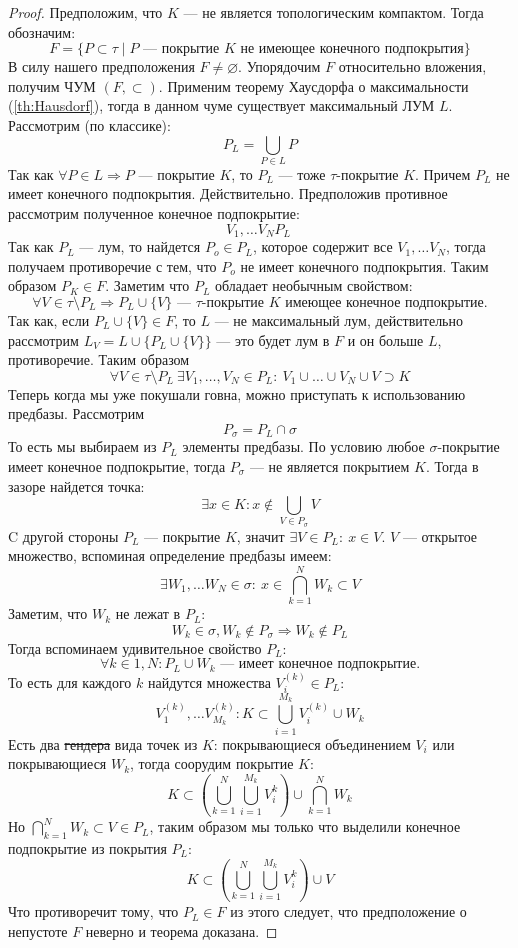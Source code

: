 \begin{proof}
	Предположим, что $K$ --- не является топологическим компактом. Тогда обозначим:
	$$
	F = \{P \subset \tau \mid P \text{ --- покрытие $K$ не имеющее конечного подпокрытия}\}
	$$
	В силу нашего предположения $F \neq \varnothing$. Упорядочим $F$ относительно вложения, получим ЧУМ $(F, \subset)$. Применим теорему Хаусдорфа о максимальности (\ref{th:Hausdorf}), тогда в данном чуме существует максимальный ЛУМ $L$. Рассмотрим (по классике):
	$$
	P_L = \bigcup_{P \in L }P
	$$
	Так как $\forall P \in L \Rightarrow P$ --- покрытие $K$, то $P_L$ --- тоже $\tau$-покрытие $K$. Причем $P_L$ не имеет конечного подпокрытия. Действительно. Предположив противное рассмотрим полученное конечное подпокрытие:
	$$
	V_1, \dots V_N P_L\
	$$
	Так как $P_L$ --- лум, то найдется $P_o \in P_L$, которое содержит все $V_1, \dots V_N$, тогда получаем противоречие с тем, что $P_o$ не имеет конечного подпокрытия. Таким образом $P_K \in F$. Заметим что $P_L$ обладает необычным свойством:
	$$
	\forall V \in \tau \setminus P_L \Rightarrow P_L \cup \{V\} \text{ --- $\tau$-покрытие $K$ имеющее конечное подпокрытие.}
	$$
	Так как, если $P_L \cup \{V\} \in F$, то $L$ --- не максимальный лум, действительно рассмотрим $L_V = L \cup \{P_L \cup \{V\}\}$ --- это будет лум в $F$ и он больше $L$, противоречие. 
	Таким образом 
	$$
	\forall V \in \tau \setminus P_L \ \exists V_1, \dots, V_N \in P_L: \ V_1 \cup \dots \cup V_N \cup V \supset K
	$$
	Теперь когда мы уже покушали говна, можно приступать к использованию предбазы. Рассмотрим 
	$$
	P_\sigma = P_L \cap \sigma
	$$
	То есть мы выбираем из $P_L$ элементы предбазы. По условию любое $\sigma$-покрытие имеет конечное подпокрытие, тогда $P_\sigma$ --- не является покрытием $K$. Тогда в зазоре найдется точка:
	$$
	\exists x \in K: x \notin \bigcup_{V \in P_\sigma} V
	$$
	C другой стороны $P_L$ --- покрытие $K$, значит $\exists V \in P_L: \ x \in V$. $V$ --- открытое множество, вспоминая определение предбазы имеем:
	$$
	\exists W_1, \dots W_N \in \sigma:  \  x \in \bigcap_{k=1}^N W_k \subset V
	$$
	Заметим, что $W_k$ не лежат в $P_L$: 
	$$
	W_k \in \sigma, W_k \notin P_\sigma \Rightarrow W_k \notin P_L
	$$
	Тогда вспоминаем удивительное свойство $P_L$: 
	$$
	\forall k \in 1,N : P_L\cup W_k \text{ --- имеет конечное подпокрытие.}
	$$
	То есть для каждого $k$ найдутся множества $V_i^{(k)} \in P_L$:
	$$
	V_1^{(k)}, \dots V_{M_k}^{(k)}: K \subset \bigcup_{i=1}^{M_k}V_i^{(k)} \cup W_k 
	$$
	Есть два \sout{гендера} вида точек из $K$: покрывающиеся объединением $V_{i}$ или покрывающиеся $W_k$, тогда соорудим покрытие $K$:
	$$
	K \subset \left(\bigcup_{k = 1}^N \bigcup_{i =1}^{M_k} V_i^{k}\right) \cup \bigcap_{k = 1}^N W_k
	$$
	Но $\bigcap_{k = 1}^N W_k \subset V \in P_L$, таким образом мы только что выделили конечное подпокрытие из покрытия $P_L$:
	$$
	K \subset \left(\bigcup_{k = 1}^N \bigcup_{i =1}^{M_k} V_i^{k}\right) \cup V
	$$
	Что противоречит тому, что $P_L \in F$ из этого следует, что предположение о непустоте $F$ неверно и теорема доказана.
\end{proof}


